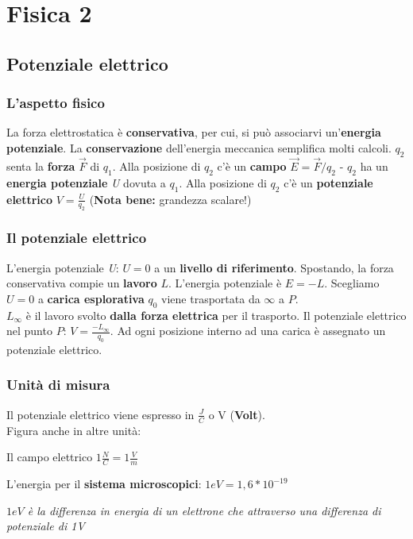 \part {Fisica 2}




\chapter{Potenziale elettrico}
\section{L'aspetto fisico}
La forza elettrostatica è \textbf{conservativa}, per cui, si può associarvi un'\textbf{energia potenziale}. La \textbf{conservazione} dell'energia meccanica semplifica molti calcoli. $q_2$ senta la \textbf{forza} $\vec{F}$ di $q_1$. Alla posizione di $q_2$ c'è un \textbf{campo} $\vec{E}=\vec{F}/q_2$ - $q_2$ ha un \textbf{energia potenziale} \textit{U} dovuta a $q_1$. Alla posizione di $q_2$ c'è un \textbf{potenziale elettrico} $V=\frac{U}{q_2}$ (\textbf{Nota bene:} grandezza scalare!)
\section{Il potenziale elettrico}
L'energia potenziale \textit{U}: $U=0$ a un \textbf{livello di riferimento}. Spostando, la forza conservativa compie un \textbf{lavoro} $L$. L'energia potenziale è $E=-L$. Scegliamo $U=0$ a \textbf{carica esplorativa} $q_0$ viene trasportata da $\infty$ a $P$.\\
$L_\infty$ è il lavoro svolto \textbf{dalla forza elettrica} per il trasporto. Il potenziale elettrico nel punto $P$: $V=\frac{-L_\infty}{q_0}$. Ad ogni posizione interno ad una carica è assegnato un potenziale elettrico.
\section{Unità di misura}
Il potenziale elettrico viene espresso in $\frac{J}{C}$ o V (\textbf{Volt}).\\
Figura anche in altre unità:
\begin{center}
  Il campo elettrico $1\frac{N}{C}=1\frac{V}{m}$
\end{center}
L'energia per il \textbf{sistema microscopici}: $1eV=1,6*10^{-19}$
\begin{center}
  \textit{\color{blue} $1eV$ è la differenza in energia di un elettrone che attraverso una differenza di potenziale di 1V}
\end{center}
